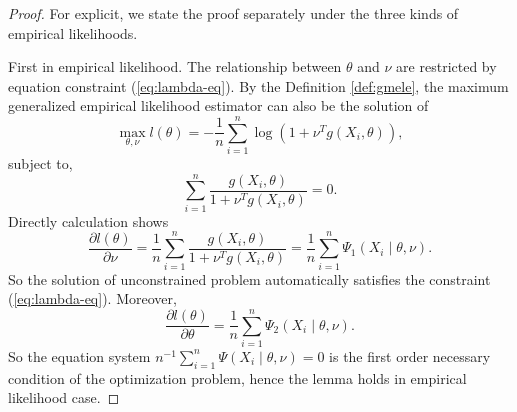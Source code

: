 \documentclass[oneside,english]{amsbook}
\numberwithin{section}{chapter}
\numberwithin{equation}{section}
\numberwithin{figure}{section}
\theoremstyle{plain}
\theoremstyle{plain}
\theoremstyle{definition}
\theoremstyle{plain}
\theoremstyle{plain}
\theoremstyle{remark}
\theoremstyle{definition}
\theoremstyle{definition}
\begin{document}
\begin{proof}
For explicit, we state the proof separately under the three kinds
of empirical likelihoods. 

First in empirical likelihood. The relationship between $\theta$
and $\nu$ are restricted by equation constraint (\ref{eq:lambda-eq}).
By the Definition \ref{def:gmele}, the maximum generalized empirical
likelihood estimator can also be the solution of 
\[
\max_{\theta,\nu}l\left(\theta\right)=-\frac{1}{n}\sum_{i=1}^{n}\log\left(1+\nu^{T}g\left(X_{i},\theta\right)\right),
\]
subject to, 
\[
\sum_{i=1}^{n}\frac{g\left(X_{i},\theta\right)}{1+\nu^{T}g\left(X_{i},\theta\right)}=0.
\]
Directly calculation shows 
\[
\frac{\partial l\left(\theta\right)}{\partial\nu}=\frac{1}{n}\sum_{i=1}^{n}\frac{g\left(X_{i},\theta\right)}{1+\nu^{T}g\left(X_{i},\theta\right)}=\frac{1}{n}\sum_{i=1}^{n}\Psi_{1}\left(X_{i}\mid\theta,\nu\right).
\]
So the solution of unconstrained problem automatically satisfies the
constraint (\ref{eq:lambda-eq}). Moreover, 
\[
\frac{\partial l\left(\theta\right)}{\partial\theta}=\frac{1}{n}\sum_{i=1}^{n}\Psi_{2}\left(X_{i}\mid\theta,\nu\right).
\]
So the equation system $n^{-1}\sum_{i=1}^{n}\Psi\left(X_{i}\mid\theta,\nu\right)=0$
is the first order necessary condition of the optimization problem,
hence the lemma holds in empirical likelihood case.


\end{proof}
\end{document}
